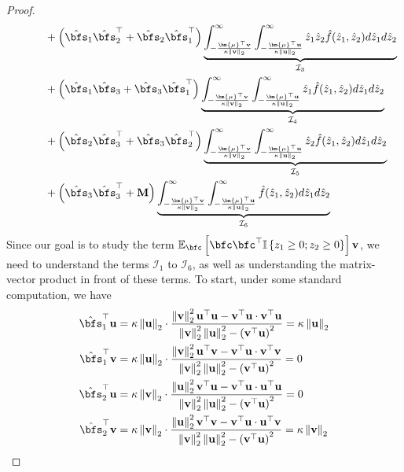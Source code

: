 \documentclass[10pt]{article} %
\theoremstyle{definition}
\theoremstyle{plain}
\newcommand{\paren}[1]{\left(#1\right)}
\newcommand{\norm}[1]{\left\|#1\right\|}
\newcommand{\indy}[1]{\mathbb{I}\left\{#1\right\}}
\providecommand{\E}{\mathbb{E}}
\def\bfM{{\mathbf{M}}}\def\bfN{{\mathbf{N}}}\def\bfO{{\mathbf{O}}}\def\bfP{{\mathbf{P}}}
\def\bfu{{\mathbf{u}}}\def\bfv{{\mathbf{v}}}\def\bfw{{\mathbf{w}}}\def\bfx{{\mathbf{x}}}
\begin{document}
\begin{proof}
\begin{align*}
        & \quad\quad\quad + \paren{\hat{\bfs}_1\hat{\bfs}_2^\top + \hat{\bfs}_2\hat{\bfs}_1^\top}\underbrace{\int_{-\frac{\bm{\mu}^\top\bfv}{\kappa\norm{\bfv}_2}}^\infty\int_{-\frac{\bm{\mu}^\top\bfu}{\kappa\norm{\bfu}_2}}^\infty\hat{z}_1\hat{z}_2\hat{f}(\hat{z}_1,\hat{z}_2)d\hat{z}_1d\hat{z}_2}_{\mathcal{I}_3}\\
        & \quad\quad\quad + \paren{\hat{\bfs}_1\hat{\bfs}_3 + \hat{\bfs}_3\hat{\bfs}_1^\top}\underbrace{\int_{-\frac{\bm{\mu}^\top\bfv}{\kappa\norm{\bfv}_2}}^\infty\int_{-\frac{\bm{\mu}^\top\bfu}{\kappa\norm{\bfu}_2}}^\infty\hat{z}_1\hat{f}(\hat{z}_1,\hat{z}_2)d\hat{z}_1d\hat{z}_2}_{\mathcal{I}_4}\\
        & \quad\quad\quad + \paren{\hat{\bfs}_2\hat{\bfs}_3^\top + \hat{\bfs}_3\hat{\bfs}_2^\top}\underbrace{\int_{-\frac{\bm{\mu}^\top\bfv}{\kappa\norm{\bfv}_2}}^\infty\int_{-\frac{\bm{\mu}^\top\bfu}{\kappa\norm{\bfu}_2}}^\infty\hat{z}_2\hat{f}(\hat{z}_1,\hat{z}_2)d\hat{z}_1d\hat{z}_2}_{\mathcal{I}_5}\\
        & \quad\quad\quad + \paren{\hat{\bfs}_3\hat{\bfs}_3^\top + \bfM}\underbrace{\int_{-\frac{\bm{\mu}^\top\bfv}{\kappa\norm{\bfv}_2}}^\infty\int_{-\frac{\bm{\mu}^\top\bfu}{\kappa\norm{\bfu}_2}}^\infty \hat{f}(\hat{z}_1,\hat{z}_2)d\hat{z}_1d\hat{z}_2}_{\mathcal{I}_6}
    \end{align*}
    Since our goal is to study the term $\E_{\bfc}\left[\bfc\bfc^\top\indy{z_1\geq 0;z_2\geq 0}\right]\bfv$, we need to understand the terms $\mathcal{I}_1$ to $\mathcal{I}_6$, as well as understanding the matrix-vector product in front of these terms. To start, under some standard computation, we have
    \begin{align*}
        \hat{\bfs}_1^\top\bfu &  = \kappa\norm{\bfu}_2\cdot \frac{\norm{\bfv}_2^2\bfu^\top\bfu - \bfv^\top\bfu\cdot\bfv^\top\bfu}{\norm{\bfv}_2^2\norm{\bfu}_2^2 - \paren{\bfv^\top\bfu}^2} = \kappa\norm{\bfu}_2\\
        \hat{\bfs}_1^\top\bfv &  = \kappa\norm{\bfu}_2\cdot \frac{\norm{\bfv}_2^2\bfu^\top\bfv - \bfv^\top\bfu\cdot\bfv^\top\bfv}{\norm{\bfv}_2^2\norm{\bfu}_2^2 - \paren{\bfv^\top\bfu}^2} = 0\\
        \hat{\bfs}_2^\top\bfu &  = \kappa\norm{\bfv}_2\cdot \frac{\norm{\bfu}_2^2\bfv^\top\bfu - \bfv^\top\bfu\cdot\bfu^\top\bfu}{\norm{\bfv}_2^2\norm{\bfu}_2^2 - \paren{\bfv^\top\bfu}^2} = 0\\
        \hat{\bfs}_2^\top\bfv &  = \kappa\norm{\bfv}_2\cdot \frac{\norm{\bfu}_2^2\bfv^\top\bfv - \bfv^\top\bfu\cdot\bfu^\top\bfv}{\norm{\bfv}_2^2\norm{\bfu}_2^2 - \paren{\bfv^\top\bfu}^2} = \kappa\norm{\bfv}_2\\

\end{align*}
\end{proof}
\end{document}
